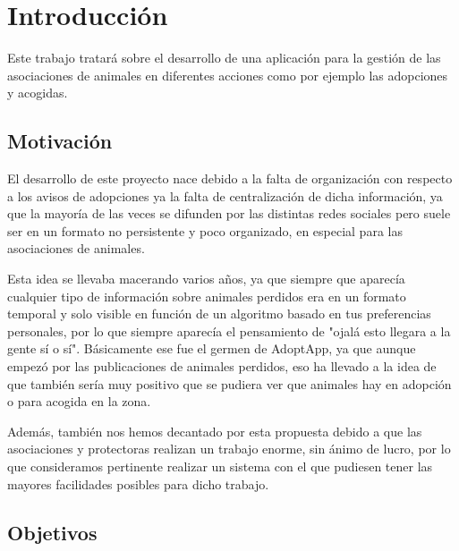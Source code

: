 
\chapter{Introducción}

Este trabajo tratará sobre el desarrollo de una aplicación para la gestión de las asociaciones de animales en diferentes acciones como por ejemplo las adopciones y acogidas.

\section{Motivación}

El desarrollo de este proyecto nace debido a la falta de organización con respecto a los avisos de adopciones ya la falta de centralización de dicha información, ya que la mayoría de las veces se difunden por las distintas redes sociales pero suele ser en un formato no persistente y poco organizado, en especial para las asociaciones de animales.

Esta idea se llevaba macerando varios años, ya que siempre que aparecía cualquier tipo de información sobre animales perdidos era en un formato temporal y solo visible en función de un algoritmo basado en tus preferencias personales, por lo que siempre aparecía el pensamiento de "ojalá esto llegara a la gente sí o sí". Básicamente ese fue el germen de AdoptApp, ya que aunque empezó por las publicaciones de animales perdidos, eso ha llevado a la idea de que también sería muy positivo que se pudiera ver que animales hay en adopción o para acogida en la zona.

Además, también nos hemos decantado por esta propuesta debido a que las asociaciones y protectoras realizan un trabajo enorme, sin ánimo de lucro, por lo que consideramos pertinente realizar un sistema con el que pudiesen tener las mayores facilidades posibles para dicho trabajo.

\section{Objetivos}

